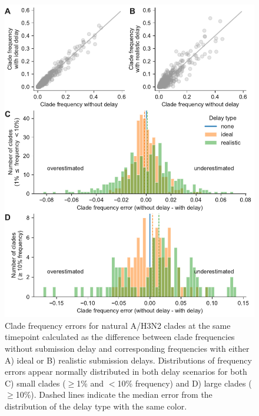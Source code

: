 \documentclass[9pt,lineno]{elife}
\begin{document}
\begin{figure}[htb!]
\includegraphics[width=\linewidth]{figures/h3n2_current_frequency_errors_by_delay}
\caption{Clade frequency errors for natural A/H3N2 clades at the same timepoint calculated as the difference between clade frequencies without submission delay and corresponding frequencies with either A) ideal or B) realistic submission delays.
Distributions of frequency errors appear normally distributed in both delay scenarios for both C) small clades ($\ge$1\% and $<$10\% frequency) and D) large clades ($\ge$10\%).
Dashed lines indicate the median error from the distribution of the delay type with the same color.}
\label{fig:h3n2_current_clade_frequency_errors}
%

\end{figure}
\end{document}
